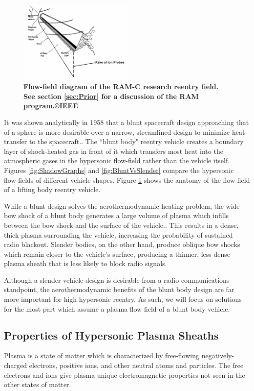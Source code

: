 \documentclass[twocolumn]{article}
\begin{document}
\begin{figure}
	\centering
	\includegraphics[width=0.5\textwidth]{Images/RAMC_FlowField.png}
	\caption{\textbf{Flow-field diagram of the RAM-C research reentry field. See section \ref{sec:Prior} for a discussion of the RAM program.\cite{rybak_causes_1970}\copyright IEEE}}
	\label{fig:RAMCFlowField}
\end{figure}

It was shown analytically in 1958 that a blunt spacecraft design approaching that of a sphere is more desirable over a narrow, streamlined design to minimize heat transfer to the spacecraft.\cite{allen_study_1958}.
The ``blunt body" reentry vehicle creates a boundary layer of shock-heated gas in front of it which transfers most heat into the atmospheric gases in the hypersonic flow-field rather than the vehicle itself.
Figures \ref{fig:ShadowGraphs} and \ref{fig:BluntVsSlender} compare the hypersonic flow-fields of different vehicle shapes.
Figure \ref{fig:RAMCFlowField} shows the anatomy of the flow-field of a lifting body reentry vehicle.

While a blunt design solves the aerothermodynamic heating problem, the wide bow shock of a blunt body generates a large volume of plasma which infills between the bow shock and the surface of the vehicle.\cite{hartunian_implications_2007}.
This results in a dense, thick plasma surrounding the vehicle, increasing the probability of sustained radio blackout.
Slender bodies, on the other hand, produce oblique bow shocks which remain closer to the vehicle's surface, producing a thinner, less dense plasma sheath that is less likely to block radio signals.\cite{hartunian_implications_2007}

Although a slender vehicle design is desirable from a radio communications standpoint, the aerothermodynamic benefits of the blunt body design are far more important for high hypersonic reentry.
As such, we will focus on solutions for the most part which assume a plasma flow field of a blunt body vehicle.


\subsection*{Properties of Hypersonic Plasma Sheaths}
Plasma is a state of matter which is characterized by free-flowing negatively-charged electrons, positive ions, and other neutral atoms and particles.
The free electrons and ions give plasma unique electromagnetic properties not seen in the other states of matter.
\end{document}

